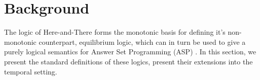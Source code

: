 \section{Background}\label{sec:background}

The logic of Here-and-There forms the monotonic basis for defining
it's non-monotonic counterpart, equilibrium logic, which can in turn
be used to give a purely logical semantics for Answer Set Programming
(ASP) \cite{pearce06a}. In this section, we present the standard
definitions of these logics, present their extensions into the
temporal setting.





